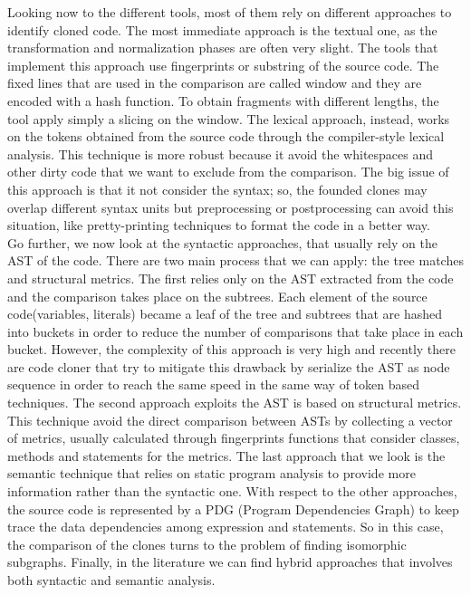 Looking now to the different tools, most of them rely on different approaches 
to identify cloned code. The most immediate approach is the textual one, as the 
transformation and normalization phases are often very slight. The tools that 
implement this approach use fingerprints or substring of the source code. The 
fixed lines that are used in the comparison are called window and they are 
encoded with a hash function. To obtain fragments with different lengths, the 
tool apply simply a slicing on the window. The lexical approach, instead, works 
on the tokens obtained from the source code through the compiler-style lexical 
analysis. This technique is more robust because it avoid the whitespaces and 
other dirty code that we want to exclude from the comparison. The big issue of 
this approach is that it not consider the syntax; so, the founded clones may 
overlap different syntax units but preprocessing or postprocessing can avoid 
this situation, like pretty-printing techniques to format the code in a better 
way.\\
Go further, we now look at the syntactic approaches, that usually rely on the 
AST of the code. There are two main process  that we can apply: the tree 
matches and structural metrics. The first relies only on the AST extracted from 
the code and the comparison takes place on the subtrees. Each element of the 
source code(variables, literals) became a leaf of the tree and subtrees that 
are hashed into buckets in order to reduce the number of comparisons that take 
place in each bucket. However, the complexity of this approach is very high and 
recently there are code cloner that try to mitigate this drawback by serialize 
the AST as node sequence in order to reach the same speed in the same way of  
token based techniques. The second approach  exploits the AST is based on 
structural metrics. This technique avoid the direct comparison between ASTs by 
collecting a vector of metrics, usually calculated through fingerprints 
functions that consider classes, methods and statements for the metrics. The 
last approach that we look is the semantic technique that relies on static 
program analysis to provide more information rather than the syntactic one. 
With respect to the other approaches, the source code is represented by a PDG 
(Program Dependencies Graph) to keep trace the data dependencies among 
expression and statements. So in this case, the comparison of the clones turns 
to the problem of finding isomorphic subgraphs. Finally, in the literature we 
can find hybrid approaches that involves both syntactic and semantic analysis. 
